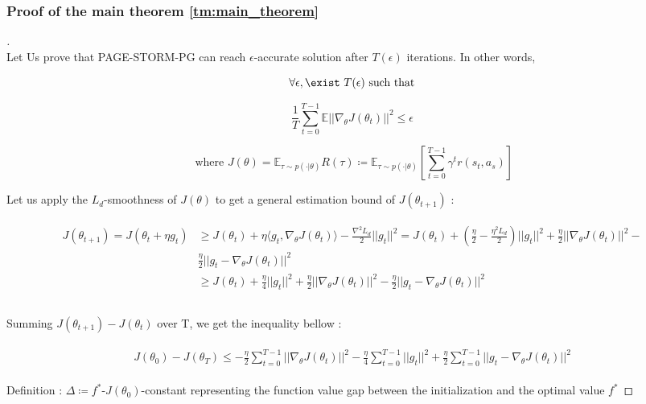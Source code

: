\documentclass[10pt,twocolumn,letterpaper]{article}
\begin{document}
\subsubsection*{Proof of the main theorem \ref{tm:main_theorem}}
\begin{proof}[]
\\
Let Us prove that PAGE-STORM-PG can reach $\epsilon$-accurate solution after $T(\epsilon)$ iterations. In other words,

$$
\forall\epsilon, \exist \text{ $T(\epsilon)$ such that}
$$

$$
\frac{1}{T}\sum_{t=0}^{T-1}\mathbb{E}||\nabla_\theta J(\theta_t)||^2\leq\epsilon
$$

$$
\text{ where }J(\theta)=\mathbb{E}_{\tau\sim p(\cdot|\theta)}R(\tau) \coloneqq \mathbb{E}_{\tau\sim p(\cdot|\theta)}[\sum_{t=0}^{T-1}\gamma^tr(s_t,a_s)]
$$

Let us apply the $L_d$-smoothness of $J(\theta)$ to get a general estimation bound of $J(\theta_{t+1})$ :

\begin{align}
\begin{split}
J(\theta_{t+1})=J(\theta_t+\eta g_t)
& \geq 
J(\theta_t)
+\eta \langle g_t,\nabla_\theta J(\theta_t)\rangle
-\frac{\nabla^2 L_d}{2}||g_t||^2 = J(\theta_t)
+(\frac{\eta}{2}
-\frac{\eta^2L_d}{2})||g_t||^2
+\frac{\eta}{2}||\nabla_\theta J(\theta_t)||^2-\nonumber\\
&\frac{\eta}{2}||g_t-\nabla_\theta J(\theta_t)||^2\nonumber\\
&
\geq J(\theta_t)
+\frac{\eta}{4}||g_t||^2
+\frac{\eta}{2}||\nabla_\theta J(\theta_t)||^2
-\frac{\eta}{2}||g_t-\nabla_\theta J(\theta_t)||^2\\
\end{split}\\
\end{align}


Summing $J(\theta_{t+1})-J(\theta_t)$ over T, we get the inequality bellow :

\begin{align}
\begin{split}
J(\theta_0)-J(\theta_T)
\leq -\frac{\eta}{2}\sum_{t=0}^{T-1}||\nabla_\theta J(\theta_t)||^2-\frac{\eta}{4}\sum_{t=0}^{T-1}||g_t||^2
+\frac{\eta}{2}\sum_{t=0}^{T-1}||g_t-\nabla_\theta J(\theta_t)||^2
\end{split}
\end{align}


Definition : $\Delta\coloneqq f^*$-$J(\theta_0)$-constant representing the function value gap between the initialization and the optimal value $f^*$


\end{proof}
\end{document}
